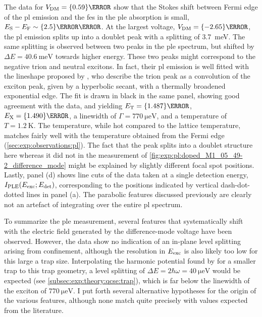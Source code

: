 The data for $\VDM = \qty{0.59}{\volt}$ show that the Stokes shift between Fermi edge of the \gls{pl} emission and the \gls{fes} in the \gls{ple} absorption is small, $E_{\mr{S}} - E_{\mr{F}}\sim\qty{2.5}{\milli\electronvolt}$.
At the largest voltage, $\VDM = \qty{-2.65}{\volt}$, the \gls{pl} emission splits up into a doublet peak with a splitting of \qty{3.7}{\milli\electronvolt}.
The same splitting is observed between two peaks in the \gls{ple} spectrum, but shifted by $\Delta E = \qty{40.6}{\milli\electronvolt}$ towards higher energy.
These two peaks might correspond to the negative trion and neutral excitons.
In fact, their \gls{pl} emission is well fitted with the lineshape proposed by \textcite{Esser2001}, who describe the trion peak as a convolution of the exciton peak, given by a hyperbolic secant, with a thermally broadened exponential edge.
The fit is drawn in black in the same panel, showing good agreement with the data, and yielding $E_{\mr{T}} = \qty{1.487}{\electronvolt}$, $E_{\mr{X}} = \qty{1.490}{\electronvolt}$, a linewidth of $\Gamma = \qty{770}{\micro\electronvolt}$, and a temperature of $T = \qty{1.2}{\kelvin}$.
The temperature, while hot compared to the lattice temperature, matches fairly well with the temperature obtained from the Fermi edge (\cref{sec:exp:observations:pl}).
The fact that the peak splits into a doublet structure here whereas it did not in the measurement of \cref{fig:exp:pl:doped_M1_05_49-2_difference_mode} might be explained by slightly different focal spot positions.
Lastly, panel (d) shows line cuts of the data taken at a single detection energy, $I_{\mathrm{PLE}}(E_{\mathrm{exc}}; E_{\mathrm{det}})$, corresponding to the positions indicated by vertical dash-dot-dotted lines in panel (a).
The parabolic features discussed previously are clearly not an artefact of integrating over the entire \gls{pl} spectrum.

To summarize the \gls{ple} measurement, several features that systematically shift with the electric field generated by the difference-mode voltage \VDM have been observed.
However, the data show no indication of an in-plane level splitting arising from confinement, although the resolution in $E_{\mathrm{exc}}$ is also likely too low for this large a trap size.
Interpolating the harmonic potential found by \textcite{Descamps2021} for a smaller trap to this trap geometry,
a level splitting of $\Delta E = 2\hbar\omega = \qty{40}{\micro\electronvolt}$ would be expected (see \cref{subsec:exp:theory:qcse:trap}), which is far below the linewidth of the exciton of $\qty{770}{\micro\electronvolt}$.
I put forth several alternative hypotheses for the origin of the various features, although none match quite precisely with values expected from the literature.

